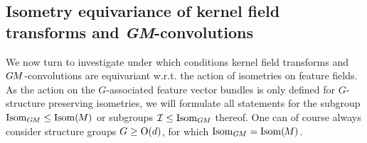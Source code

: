 

\subsection{Isometry equivariance of kernel field transforms and \textit{GM}-convolutions}
\label{sec:isometry_equivariance}


We now turn to investigate under which conditions kernel field transforms and $G\mkern-1.4muM$-convolutions are equivariant w.r.t. the action of isometries on feature fields.
As the action on the $G$-associated feature vector bundles is only defined for $G$-structure preserving isometries, we will formulate all statements for the subgroup $\operatorname{Isom}_{G\mkern-1.4muM} \leq \operatorname{Isom}(\mkern-1.5mu M \mkern-.5mu)$ or subgroups $\mathcal{I} \leq \operatorname{Isom}_{G\mkern-1.4muM}$ thereof.
One can of course always consider structure groups $G\geq\operatorname{O}(d)$, for which $\operatorname{Isom}_{G\mkern-1.4muM} = \operatorname{Isom}(\mkern-1.5mu M \mkern-.5mu)$.


